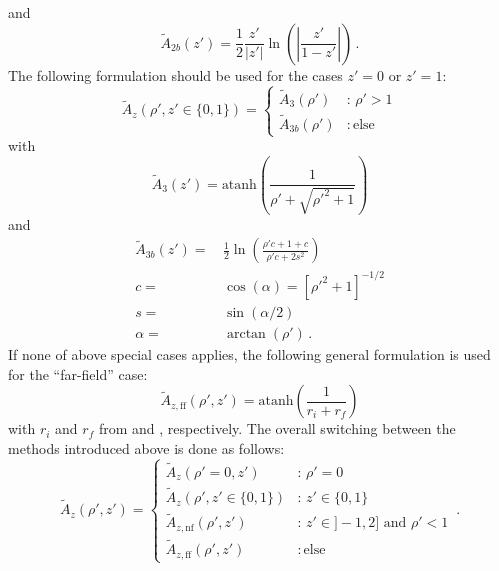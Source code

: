 and
\begin{equation}
  \tilde{A}_{2b}(z') = \frac{1}{2} \frac{z'}{|z'|} \ln \left(\left| \frac{z'}{1-z'} \right| \right) \, .
\end{equation}
The following formulation should be used for the cases $z'=0$ or $z'=1$:
\begin{equation}
  \tilde{A}_z (\rho', z' \in \{0, 1\})
  = \begin{cases}
      \tilde{A}_3(\rho')  &:\, \rho' > 1 \\
      \tilde{A}_{3b}(\rho') &:\, \textrm{else}
    \end{cases}
\end{equation}
with
\begin{equation}
  \tilde{A}_3(z') = \textrm{atanh}\left( \frac{1}{\rho' + \sqrt{{\rho'}^2 + 1}} \right)
\end{equation}
and
\begin{align}
  \tilde{A}_{3b}(z') =&\, \frac{1}{2} \ln \left(\frac{\rho' c + 1 + c}{\rho' c + 2 s^2 }\right) \\
  c =&\, \cos(\alpha) = \left[{\rho'}^2 + 1 \right]^{-1/2} \\
  s =&\, \sin(\alpha/2)  \\
 \alpha =&\, \arctan(\rho') \, .
\end{align}
If none of above special cases applies,
the following general formulation is used for the ``far-field'' case:
\begin{equation}
  \tilde{A}_{z,\mathrm{ff}} (\rho', z') = \textrm{atanh}\left( \frac{1}{r_i + r_f} \right)
\end{equation}
with $r_i$ and $r_f$ from  and , respectively.
%
%
The overall switching between the methods introduced above is done as follows:
\begin{equation}
  \tilde{A}_z (\rho', z')
  = \begin{cases}
      \tilde{A}_z (\rho'=0, z')             &:\, \rho' = 0 \\
      \tilde{A}_z (\rho', z' \in \{0, 1\})  &:\, z' \in \{0, 1\} \\
      \tilde{A}_{z,\mathrm{nf}} (\rho', z') &:\, z' \in ]-1, 2] \textrm{ and } \rho' < 1 \\
      \tilde{A}_{z,\mathrm{ff}} (\rho', z') &:\, \textrm{else}
    \end{cases} \, .
\end{equation}

